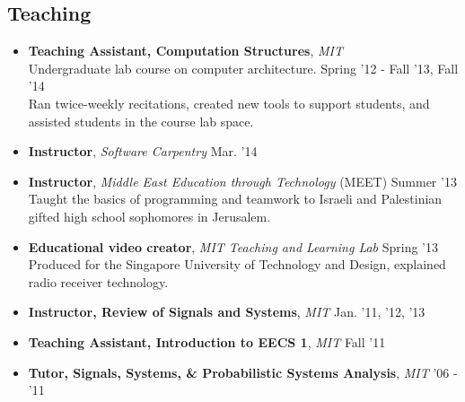 \documentclass[margin]{res}
\begin{document}
\begin{resume}
\section{Teaching}
\begin{itemize}[leftmargin=*] %
\item {\bf Teaching Assistant, Computation Structures}, {\it MIT} \\Undergraduate lab course on computer architecture. \hfill Spring '12 - Fall '13, Fall '14 \\Ran twice-weekly recitations, created new tools to support students, and assisted students in the course lab space.  
\item {\bf Instructor}, {\it Software Carpentry} \hfill Mar. '14 \\ 
\item {\bf Instructor}, {\it Middle East Education through Technology} (MEET) \hfill Summer '13 \\ Taught the basics of programming and teamwork to Israeli and Palestinian gifted high school sophomores in Jerusalem.
\item {\bf Educational video creator}, {\it MIT Teaching and Learning Lab} \hfill Spring '13 \\
Produced for the Singapore University of Technology and Design, explained radio receiver technology.
\item {\bf Instructor, Review of Signals and Systems}, {\it MIT} \hfill Jan. '11, '12, '13 %
\item {\bf Teaching Assistant, Introduction to EECS 1}, {\it MIT} \hfill Fall '11 %

\item {\bf Tutor, Signals, Systems, \& Probabilistic Systems Analysis}, {\it MIT} \hfill '06 - '11 %
\end{itemize}





\end{resume}
\end{document}
